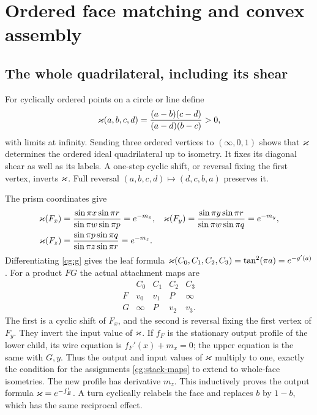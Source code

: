 \section{Ordered face matching and convex assembly}
\label{cg:assembly}

\subsection{The whole quadrilateral, including its shear}
For cyclically ordered points on a circle or line define
\begin{equation}\label{cg:kappa}
 \varkappa(a,b,c,d)=\frac{(a-b)(c-d)}{(a-d)(b-c)}>0,
\end{equation}
with limits at infinity. Sending three ordered vertices to
$(\infty,0,1)$ shows that $\varkappa$ determines the ordered ideal
quadrilateral up to isometry. It fixes its diagonal shear as well
as its labels. A one-step cyclic shift, or reversal fixing the
first vertex, inverts $\varkappa$. Full reversal
$(a,b,c,d)\mapsto(d,c,b,a)$ preserves it.

The prism coordinates give
\begin{align}
 \varkappa(F_x)&=\frac{\sin\pi x\sin\pi r}{\sin\pi w\sin\pi p}
              =e^{-m_x},&
 \varkappa(F_y)&=\frac{\sin\pi y\sin\pi r}{\sin\pi w\sin\pi q}
              =e^{-m_y},\label{cg:input-kappa}\\
 \varkappa(F_z)&=\frac{\sin\pi p\sin\pi q}{\sin\pi z\sin\pi r}
              =e^{-m_z}.&&\label{cg:output-kappa}
\end{align}
Differentiating \eqref{cg:g} gives the leaf formula
$\varkappa(C_0,C_1,C_2,C_3)=\tan^2(\pi a)=e^{-g'(a)}$.
For a product $FG$ the actual attachment maps are
\begin{equation}\label{cg:stack-maps}
\begin{array}{c|cccc}
 &C_0&C_1&C_2&C_3\\ \hline
 F&v_0&v_1&P&\infty\\
 G&\infty&P&v_2&v_3 .
\end{array}
\end{equation}
The first is a cyclic shift of $F_x$, and the second is reversal
fixing the first vertex of $F_y$. They invert the input value of
$\varkappa$. If $f_F$ is the stationary output profile of the lower
child, its wire equation is $f_F'(x)+m_x=0$; the upper equation
is the same with $G,y$. Thus the output and input values of
$\varkappa$ multiply to one, exactly the condition for the assignments
\eqref{cg:stack-maps} to extend to whole-face isometries.
The new profile has derivative $m_z$. This inductively proves
the output formula $\varkappa=e^{-f_E'}$.
A turn cyclically relabels the face and replaces $b$ by $1-b$,
which has the same reciprocal effect.

